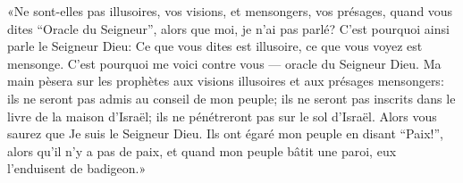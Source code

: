 «Ne sont-elles pas illusoires, vos visions, et mensongers, vos présages,
	quand vous dites “Oracle du Seigneur”, alors que moi, je n’ai pas parlé?
C’est pourquoi ainsi parle le Seigneur Dieu:
	Ce que vous dites est illusoire, ce que vous voyez est mensonge.
C’est pourquoi me voici contre vous --- oracle du Seigneur Dieu.
Ma main pèsera sur les prophètes aux visions illusoires et aux présages mensongers:
	ils ne seront pas admis au conseil de mon peuple;
	ils ne seront pas inscrits dans le livre de la maison d’Israël;
	ils ne pénétreront pas sur le sol d’Israël.
Alors vous saurez que Je suis le Seigneur Dieu.
Ils ont égaré mon peuple en disant “Paix!”, alors qu’il n’y a pas de paix,
	et quand mon peuple bâtit une paroi, eux l’enduisent de badigeon.»

